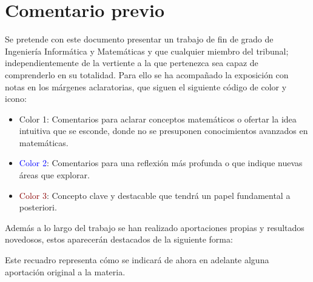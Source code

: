
\section*{Comentario previo}

Se pretende con este documento presentar un  trabajo de fin de grado de Ingeniería Informática y Matemáticas y que cualquier miembro del tribunal; 
independientemente de la vertiente a la que pertenezca sea capaz de comprenderlo en su totalidad.  
Para ello se ha acompañado la exposición con notas en los márgenes aclaratorias, que siguen el siguiente código de color y icono: 

\begin{itemize}
    \item  \iconoAclaraciones \textcolor{dark_green}{  Color 1}: Comentarios para 
    aclarar conceptos matemáticos o ofertar la idea intuitiva que 
    se esconde, donde no se presuponen conocimientos avanzados en 
    matemáticas. 
    \item  \iconoProfundizar \textcolor{blue}{  Color 2}: Comentarios para una reflexión más profunda o que indique nuevas áreas que explorar. 
    \item  \iconoClave  \textcolor{darkRed}{  Color 3}: Concepto clave y destacable que tendrá un papel fundamental a posteriori.  
\end{itemize}


Además a lo largo del trabajo se han realizado aportaciones propias y resultados novedosos, estos aparecerán destacados de la siguiente forma: 

\begin{aportacionOriginal}
    Este recuadro representa cómo se indicará de ahora en adelante alguna aportación original a la materia. 
\end{aportacionOriginal}
